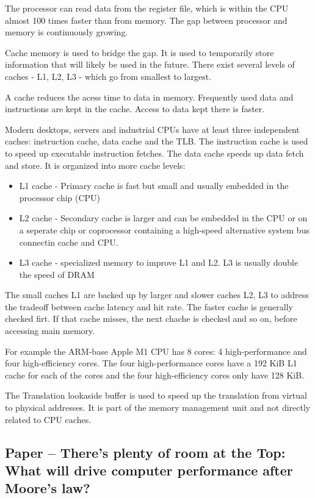 \documentclass[runningheads]{llncs}
\begin{document}
The processor can read data from the register file, which is within the CPU almost 100 times faster than from memory. The gap between processor and memory is continuously growing. 

Cache memory is used to bridge the gap. It is used to temporarily store information that will likely be used in the future. There exist several levels of caches -  L1, L2, L3 - which go from smallest to largest. 

A cache reduces the acess time to data in memory. Frequently used data and instructions are kept in the cache. Access to data kept there is faster.

Modern desktops, servers and industrial CPUs have at least three independent caches: instruction cache, data cache and the TLB. The instruction cache is used to speed up executable instruction fetches. The data cache speeds up data fetch and store. It is organized into more cache levels:
\begin{itemize}
	\item L1 cache - Primary cache is fast but small and usually embedded in the processor chip (CPU)
	\item L2 cache - Secondary cache is larger and can be embedded in the CPU or on a seperate chip or coprocessor containing a high-speed alternative system bus connectin cache and CPU.
	\item L3 cache - specialized memory to improve L1 and L2. L3 is usually double the speed of DRAM
\end{itemize}
The small caches L1 are backed up by larger and slower caches L2, L3 to address the tradeoff between cache latency and hit rate. The faster cache is generally checked firt. If that cache misses, the next chache is checked and so on, before accessing main memory.

For example the ARM-base Apple M1 CPU has 8 cores: 4 high-performance and four high-efficiency cores. The four high-performance cores have a 192 KiB L1 cache for each of the cores and the four high-efficiency cores only have 128 KiB.

The Translation lookaside buffer is used to speed up the translation from virtual to physical addresses. It is part of the memory management unit and not directly related to CPU caches.


\subsection {Paper – There’s plenty of room at the Top: What will drive computer performance after Moore’s law?}
\end{document}
